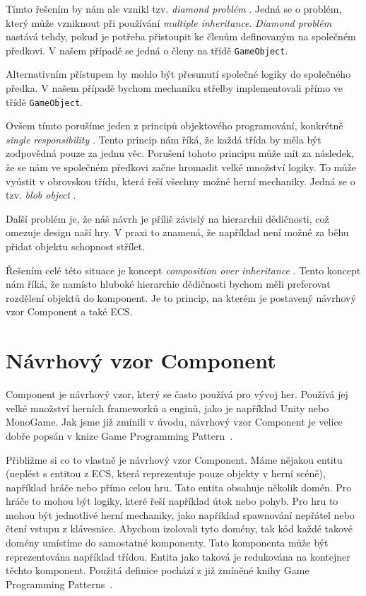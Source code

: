 Tímto řešením by nám ale vznikl tzv. \textit{diamond problém} . Jedná se o problém, který může vzniknout při používání \textit{multiple inheritance}. \textit{Diamond problém} nastává tehdy, pokud je potřeba přistoupit ke členům definovaným na společném předkovi. V našem případě se jedná o členy na třídě \verb|GameObject|.

Alternativním přístupem by mohlo být přesunutí společné logiky do společného předka. V našem případě bychom mechaniku střelby implementovali přímo ve třídě \verb|GameObject|.

Ovšem tímto porušíme jeden z principů objektového programování, konkrétně \textit{single responsibility} . Tento princip nám říká, že každá třída by měla být zodpovědná pouze za jednu věc. Porušení tohoto principu může mít za následek, že se nám ve společném předkovi začne hromadit velké množství logiky. To může vyústit v obrovskou třídu, která řeší všechny možné herní mechaniky. Jedná se o tzv. \textit{blob object} . 

Další problém je, že náš návrh je příliš závislý na hierarchii dědičnosti, což omezuje design naší hry. V praxi to znamená, že například není možné za běhu přidat objektu schopnost střílet.

Řešením celé této situace je koncept \textit{composition over inheritance} . Tento koncept nám říká, že namísto hluboké hierarchie dědičnosti bychom měli preferovat rozdělení objektů do komponent. Je to princip, na kterém je postavený návrhový vzor Component a také ECS.

\section{Návrhový vzor Component}
\label{sec:component}
Component je návrhový vzor, který se často používá pro vývoj her. Používá jej velké množství herních frameworků a enginů, jako je například Unity nebo MonoGame. Jak jsme již zmínili v úvodu, návrhový vzor Component je velice dobře popsán v knize Game Programming Pattern~\cite{nystrom2014game}.

Přibližme si co to vlastně je návrhový vzor Component. Máme nějakou entitu (neplést s entitou z ECS, která reprezentuje pouze objekty v herní scéně), například hráče nebo přímo celou hru. Tato entita obsahuje několik domén. Pro hráče to mohou být logiky, které řeší například útok nebo pohyb. Pro hru to mohou být jednotlivé herní mechaniky, jako například spawnování nepřátel nebo čtení vstupu z klávesnice. Abychom izolovali tyto domény, tak kód každé takové domény umístíme do samostatné komponenty. Tato komponenta může být reprezentována například třídou. Entita jako taková je redukována na kontejner těchto komponent. Použitá definice pochází z již zmíněné knihy Game Programming Patterns~\cite{nystrom2014game}.

